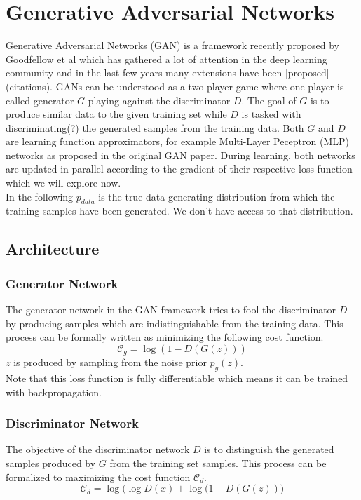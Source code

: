 \documentclass[twoside,11pt,a4paper]{article}
\theoremstyle{break}
\begin{document}
\section{Generative Adversarial Networks}
\label{sec:gan}

Generative Adversarial Networks (GAN) is a framework recently proposed by Goodfellow et al which has gathered a lot of attention in the deep learning community and in the last few years many extensions have been [proposed] (citations).
GANs can be understood as a two-player game where one player is called generator $G$ playing against the discriminator $D$.
The goal of $G$ is to produce similar data to the given training set while $D$ is tasked with discriminating(?) the generated samples from the training data. Both $G$ and $D$ are learning function approximators, for example Multi-Layer Peceptron (MLP) networks as proposed in the original GAN paper.
During learning, both networks are updated in parallel according to the gradient of their respective loss function which we will explore now.\\
In the following $p_{data}$ is the true data generating distribution from which the training samples have been generated.
We don't have access to that distribution.

\subsection{Architecture}
\label{sub:gan_arch}


\subsubsection{Generator Network}
The generator network in the GAN framework tries to fool the discriminator $D$ by producing samples which are indistinguishable from the training data.
This process can be formally written as minimizing the following cost function.
$$
\mathcal{C}_g = \log(1 - D(G(z)))
$$
$z$ is produced by sampling from the noise prior $p_g(z)$.\\

Note that this loss function is fully differentiable which means it can be trained with backpropagation.



\subsubsection{Discriminator Network}
The objective of the discriminator network $D$ is to distinguish the generated samples produced by $G$ from the training set samples.
This process can be formalized to maximizing the cost function $\mathcal{C}_d$.
$$
\mathcal{C}_d = \log\big(\log D(x) + \log (1 - D(G(z))\big)
$$
\end{document}
